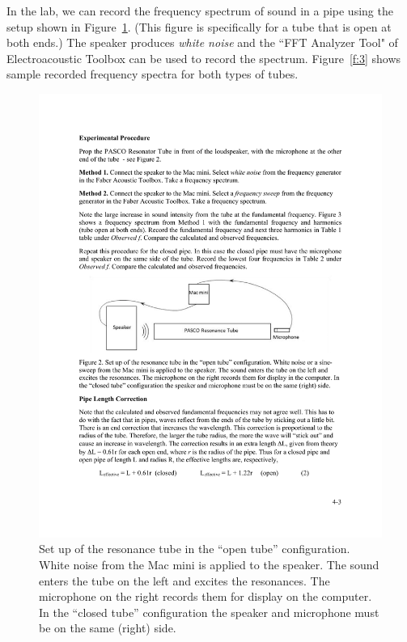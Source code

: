 \documentclass[11pt]{NSF}
\begin{document}
In the lab, we can record the frequency spectrum of sound in a pipe
using the setup shown in Figure~\ref{f:2}.
(This figure is specifically for a tube that is open at both ends.)
The speaker produces {\em white noise} and the ``FFT Analyzer Tool"
of Electroacoustic Toolbox can be used to record the spectrum.
Figure~\ref{f:3} shows sample recorded frequency spectra for both 
types of tubes.
%
\begin{figure}[hbtp]
\begin{center}
\includegraphics[width=.65\textwidth]{fig4_2}
\caption{Set up of the resonance tube in the ``open tube” configuration. White
noise from the Mac mini is applied to the speaker. The sound
enters the tube on the left and excites the resonances. The microphone on the
right records them for display on the computer. In the ``closed tube” 
configuration the speaker and microphone must be on the same (right) side.}
\label{f:2} 
\end{center} 
\end{figure}
%
%
\end{document}
